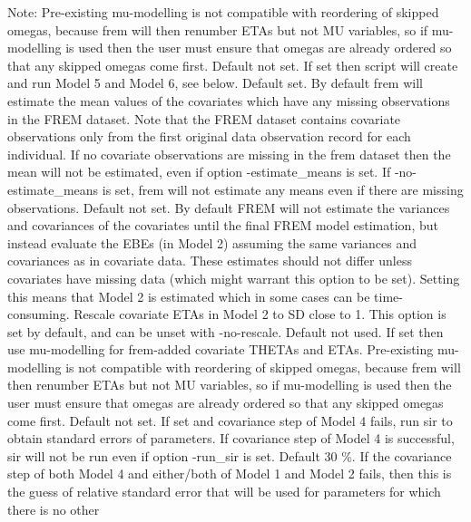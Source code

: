 \begin{optionlist}
Note: Pre-existing mu-modelling is not compatible with reordering of skipped omegas,
because frem will then renumber ETAs but not MU variables,
so if mu-modelling is used then the user must ensure that omegas are already ordered
so that any skipped omegas come first.
\nextopt
{}
Default not set.
If set then script will create and run Model 5 and Model 6, see below.
\nextopt
{}
Default set.
By default frem will estimate
the mean values of the covariates which have any missing observations in the FREM dataset.
Note that the FREM dataset contains covariate observations only from the first original data
observation record for each individual.
If no covariate observations are missing in the frem dataset then the mean
will not be estimated,
even if option -estimate\_means is set.
If -no-estimate\_means is set, frem will not estimate any means even if there are missing observations.
\nextopt
{}
Default not set.
By default FREM will not estimate the variances and covariances of the covariates
until the final FREM model estimation, but instead evaluate the EBEs (in Model 2) assuming the same
variances and covariances as in covariate data. These estimates should not differ unless covariates
have missing data (which might warrant this option to be set). Setting this means that Model 2 is
estimated which in some cases can be time-consuming.
\nextopt
{}
Rescale covariate ETAs in Model 2 to SD close to 1. This option is set by default, and can be unset with -no-rescale.
\nextopt
{}
Default not used. If set then use mu-modelling for frem-added covariate
THETAs and ETAs.
Pre-existing mu-modelling is not compatible with reordering of skipped omegas,
because frem will then renumber ETAs but not MU variables,
so if mu-modelling is used then the user must ensure that omegas are already ordered
so that any skipped omegas come first.
\nextopt
{}
Default not set. If set and covariance step of Model 4 fails, run sir
to obtain standard errors of parameters.
If covariance step of Model 4 is successful, sir will not be run even if option
-run\_sir is set.
\nextopt
{}
Default 30 \%.
If the covariance step of both Model 4 and either/both of Model 1 and Model 2 fails, then
this is the guess of relative standard error that will be used for parameters for which there is no other

\end{optionlist}
